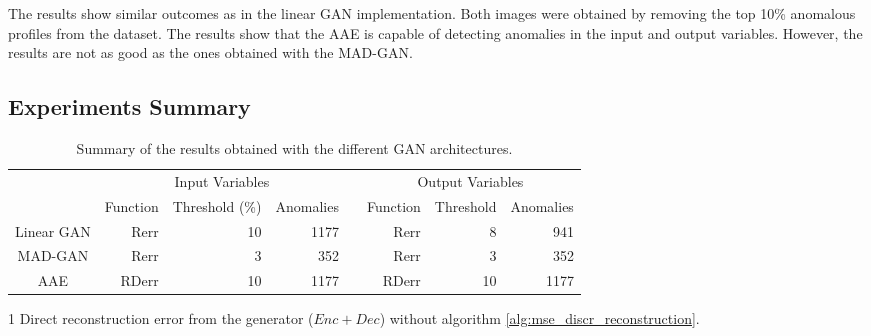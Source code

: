 The results show similar outcomes as in the linear GAN implementation. Both images were obtained by removing the top 10\% anomalous profiles from the dataset. The results show that the AAE is capable of detecting anomalies in the input and output variables. However, the results are not as good as the ones obtained with the MAD-GAN.


\subsection{Experiments Summary}\label{gan_experiments_summary}

\begin{table}[]
\caption{Summary of the results obtained with the different GAN architectures.}\label{tab:gan_results}
\begin{threeparttable}[b]
\begin{tabular}{@{}crrrlrrr@{}}
\toprule
\multicolumn{1}{l}{} & \multicolumn{3}{c}{Input Variables}                                                               &  & \multicolumn{3}{c}{Output Variables}                                                         \\ \cmidrule(lr){2-4} \cmidrule(l){6-8} 
\multicolumn{1}{l}{} & \multicolumn{1}{c}{Function} & \multicolumn{1}{c}{Threshold (\%)} & \multicolumn{1}{c}{Anomalies} &  & \multicolumn{1}{c}{Function} & \multicolumn{1}{c}{Threshold} & \multicolumn{1}{c}{Anomalies} \\ \cmidrule(lr){2-4} \cmidrule(l){6-8} 
Linear GAN           & Rerr                         & 10                                 & 1177                          &  & Rerr                         & 8                             & 941                           \\
MAD-GAN              & Rerr                         & 3                                  & 352                           &  & Rerr                         & 3                             & 352                           \\
AAE                  & RDerr\tnote{1}                        & 10                                 & 1177                          &  & RDerr\tnote{1}                        & 10                            & 1177                          \\ \bottomrule
\end{tabular}
\begin{tablenotes}
    \item [1] Direct reconstruction error from the generator ($Enc+Dec$) without algorithm \ref{alg:mse_discr_reconstruction}.
\end{tablenotes}
\end{threeparttable}
\end{table}

